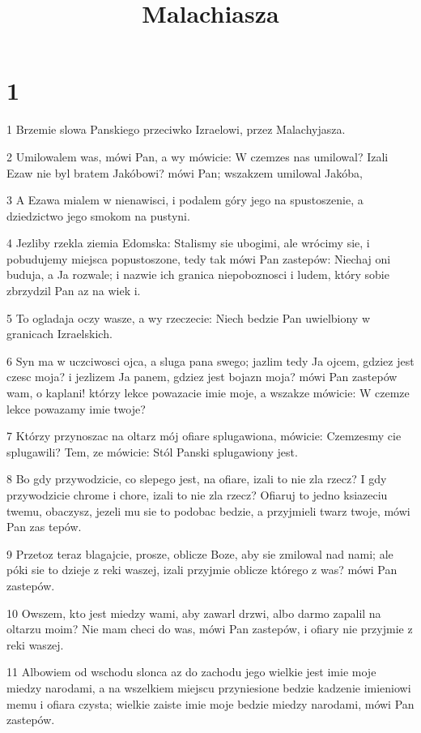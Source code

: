 

\title{Malachiasza}


\chapter{1}

\par 1 Brzemie slowa Panskiego przeciwko Izraelowi, przez Malachyjasza.
\par 2 Umilowalem was, mówi Pan, a wy mówicie: W czemzes nas umilowal? Izali Ezaw nie byl bratem Jakóbowi? mówi Pan; wszakzem umilowal Jakóba,
\par 3 A Ezawa mialem w nienawisci, i podalem góry jego na spustoszenie, a dziedzictwo jego smokom na pustyni.
\par 4 Jezliby rzekla ziemia Edomska: Stalismy sie ubogimi, ale wrócimy sie, i pobudujemy miejsca popustoszone, tedy tak mówi Pan zastepów: Niechaj oni buduja, a Ja rozwale; i nazwie ich granica niepoboznosci i ludem, który sobie zbrzydzil Pan az na wiek i.
\par 5 To ogladaja oczy wasze, a wy rzeczecie: Niech bedzie Pan uwielbiony w granicach Izraelskich.
\par 6 Syn ma w uczciwosci ojca, a sluga pana swego; jazlim tedy Ja ojcem, gdziez jest czesc moja? i jezlizem Ja panem, gdziez jest bojazn moja? mówi Pan zastepów wam, o kaplani! którzy lekce powazacie imie moje, a wszakze mówicie: W czemze lekce powazamy imie twoje?
\par 7 Którzy przynoszac na oltarz mój ofiare splugawiona, mówicie: Czemzesmy cie splugawili? Tem, ze mówicie: Stól Panski splugawiony jest.
\par 8 Bo gdy przywodzicie, co slepego jest, na ofiare, izali to nie zla rzecz? I gdy przywodzicie chrome i chore, izali to nie zla rzecz? Ofiaruj to jedno ksiazeciu twemu, obaczysz, jezeli mu sie to podobac bedzie, a przyjmieli twarz twoje, mówi Pan zas tepów.
\par 9 Przetoz teraz blagajcie, prosze, oblicze Boze, aby sie zmilowal nad nami; ale póki sie to dzieje z reki waszej, izali przyjmie oblicze którego z was? mówi Pan zastepów.
\par 10 Owszem, kto jest miedzy wami, aby zawarl drzwi, albo darmo zapalil na oltarzu moim? Nie mam checi do was, mówi Pan zastepów, i ofiary nie przyjmie z reki waszej.
\par 11 Albowiem od wschodu slonca az do zachodu jego wielkie jest imie moje miedzy narodami, a na wszelkiem miejscu przyniesione bedzie kadzenie imieniowi memu i ofiara czysta; wielkie zaiste imie moje bedzie miedzy narodami, mówi Pan zastepów.
